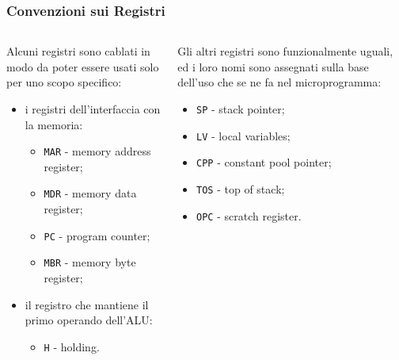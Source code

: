 \documentclass{beamer}
\begin{document}
\begin{frame}
  \frametitle{Convenzioni sui Registri}
  \begin{columns}
    \begin{column}{0.5\textwidth}
  Alcuni registri sono cablati in modo da poter essere usati solo per uno scopo
  specifico:
  \begin{itemize}
    \item i registri dell'interfaccia con la memoria:
    \begin{itemize}
      \item \lstinline{MAR} - memory address register;
      \item \lstinline{MDR} - memory data register;
      \item \lstinline{PC} - program counter;
      \item \lstinline{MBR} - memory byte register;
    \end{itemize}
    \item il registro che mantiene il primo operando dell'ALU:
    \begin{itemize}
      \item \lstinline{H} - holding.
    \end{itemize}
  \end{itemize}
  \end{column}

  \begin{column}{0.5\textwidth}
  Gli altri registri sono funzionalmente uguali, ed i loro nomi sono assegnati
  sulla base dell'uso che se ne fa nel microprogramma:
  \begin{itemize}
    \item \lstinline{SP} - stack pointer;
    \item \lstinline{LV} - local variables;
    \item \lstinline{CPP} - constant pool pointer;
    \item \lstinline{TOS} - top of stack;
    \item \lstinline{OPC} - scratch register.
  \end{itemize}
\end{column}
\end{columns}
\end{frame}
\end{document}
